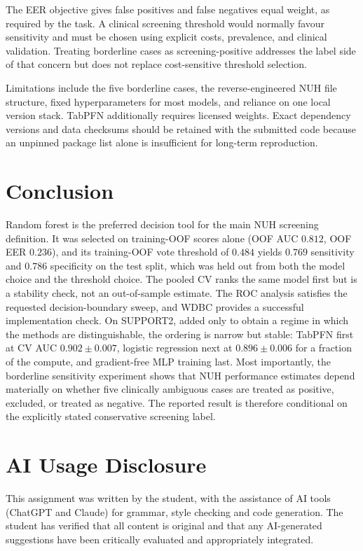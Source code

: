 \documentclass[11pt,a4paper]{article}
\begin{document}
The EER objective gives false positives and false negatives equal weight, as required by the task. A clinical screening threshold would normally favour sensitivity and must be chosen using explicit costs, prevalence, and clinical validation. Treating borderline cases as screening-positive addresses the label side of that concern but does not replace cost-sensitive threshold selection.

Limitations include the five borderline cases, the reverse-engineered NUH file structure, fixed hyperparameters for most models, and reliance on one local version stack. TabPFN additionally requires licensed weights. Exact dependency versions and data checksums should be retained with the submitted code because an unpinned package list alone is insufficient for long-term reproduction.

\section{Conclusion}
Random forest is the preferred decision tool for the main NUH screening definition. It was selected on training-OOF scores alone (OOF AUC $0.812$, OOF EER $0.236$), and its training-OOF vote threshold of $0.484$ yields $0.769$ sensitivity and $0.786$ specificity on the test split, which was held out from both the model choice and the threshold choice. The pooled CV ranks the same model first but is a stability check, not an out-of-sample estimate. The ROC analysis satisfies the requested decision-boundary sweep, and WDBC provides a successful implementation check. On SUPPORT2, added only to obtain a regime in which the methods are distinguishable, the ordering is narrow but stable: TabPFN first at CV AUC $0.902\pm0.007$, logistic regression next at $0.896\pm0.006$ for a fraction of the compute, and gradient-free MLP training last. Most importantly, the borderline sensitivity experiment shows that NUH performance estimates depend materially on whether five clinically ambiguous cases are treated as positive, excluded, or treated as negative. The reported result is therefore conditional on the explicitly stated conservative screening label.

\section{AI Usage Disclosure}
This assignment was written by the student, with the assistance of AI tools (ChatGPT and Claude) for grammar, style checking and code generation. The student has verified that all content is original and that any AI-generated suggestions have been critically evaluated and appropriately integrated.
\end{document}
